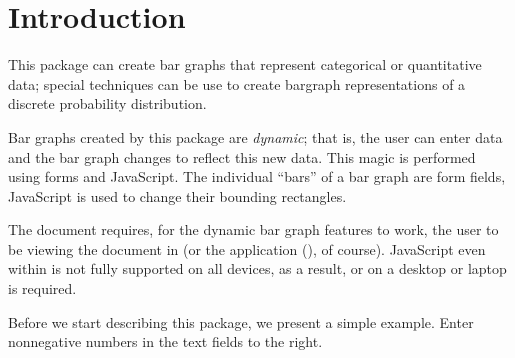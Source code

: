 \documentclass{article}
\begin{document}
\maketitle

\tableofcontents
{}


\section{Introduction}\label{intro}

This package can create bar graphs that represent categorical or quantitative
data; special techniques can be use to create bargraph representations of a
discrete probability distribution.

Bar graphs created by this package are \emph{dynamic}; that is, the user
can enter data and the bar graph changes to reflect this new data. This magic
is performed using  forms and  JavaScript. The
individual ``bars'' of a bar graph are form fields, JavaScript is used to
change their bounding rectangles.

The document requires, for the dynamic bar graph features to work, the user to
be viewing the document in  (or the  application
(), of course). JavaScript even within  is not fully
supported on all devices, as a result,  or  on a desktop or
laptop is required.

Before we start describing this package, we present a simple example. Enter nonnegative numbers
in the text fields to the right.\vcgBdry[6bp]

\hfill
\begin{minipage}[b][2in][c]
  {\linewidth-2\fboxsep-2\fboxrule-(23bp*4)-10pt}\kern0pt\parskip3pt
  \vcgBdry[3bp]
  \vcgBdry[3bp]
  \vcgBdry[3bp]
  \vcgBdry[4bp]
\end{minipage}\vcgBdry[6bp]
\end{document}

